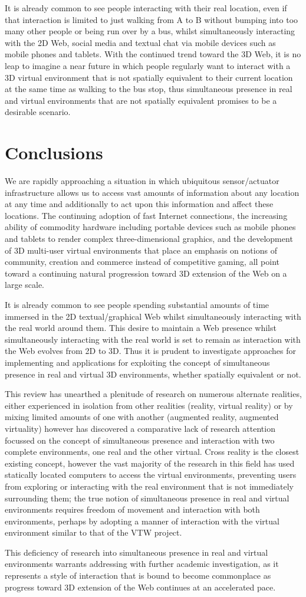 It is already common to see people interacting with their real location, even if that interaction is limited to just walking from A to B without bumping into too many other people or being run over by a bus, whilst simultaneously interacting with the 2D Web, social media and textual chat via mobile devices such as mobile phones and tablets. With the continued trend toward the 3D Web, it is no leap to imagine a near future in which people regularly want to interact with a 3D virtual environment that is not spatially equivalent to their current location at the same time as walking to the bus stop, thus simultaneous presence in real and virtual environments that are not spatially equivalent promises to be a desirable scenario.

\section{Conclusions}
We are rapidly approaching a situation in which ubiquitous sensor/actuator infrastructure allows us to access vast amounts of information about any location at any time and additionally to act upon this information and affect these locations. The continuing adoption of fast Internet connections, the increasing ability of commodity hardware including portable devices such as mobile phones and tablets to render complex three-dimensional graphics, and the development of 3D multi-user virtual environments that place an emphasis on notions of community, creation and commerce instead of competitive gaming, all point toward a continuing natural progression toward 3D extension of the Web on a large scale.

It is already common to see people spending substantial amounts of time immersed in the 2D textual/graphical Web whilst simultaneously interacting with the real world around them. This desire to maintain a Web presence whilst simultaneously interacting with the real world is set to remain as interaction with the Web evolves from 2D to 3D. Thus it is prudent to investigate approaches for implementing and applications for exploiting the concept of simultaneous presence in real and virtual 3D environments, whether spatially equivalent or not.

This review has unearthed a plenitude of research on numerous alternate realities, either experienced in isolation from other realities (reality, virtual reality) or by mixing limited amounts of one with another (augmented reality, augmented virtuality) however has discovered a comparative lack of research attention focussed on the concept of simultaneous presence and interaction with two complete environments, one real and the other virtual. Cross reality is the closest existing concept, however the vast majority of the research in this field has used statically located computers to access the virtual environments, preventing users from exploring or interacting with the real environment that is not immediately surrounding them; the true notion of simultaneous presence in real and virtual environments requires freedom of movement and interaction with both environments, perhaps by adopting a manner of interaction with the virtual environment similar to that of the VTW project.

This deficiency of research into simultaneous presence in real and virtual environments warrants addressing with further academic investigation, as it represents a style of interaction that is bound to become commonplace as progress toward 3D extension of the Web continues at an accelerated pace.